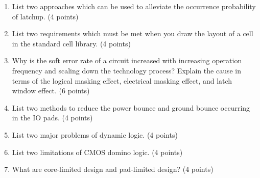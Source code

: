 \documentclass[10pt]{article}
\begin{document}
\begin{enumerate}[label=(\alph*)]
\item List two approaches which can be used to alleviate the occurrence probability of latchup. (4 points)
\item List two requirements which must be met when you draw the layout of a cell in the standard cell library. (4 points)
\item Why is the soft error rate of a circuit increased with increasing operation frequency and scaling down the technology process? Explain the cause in terms of the logical masking effect, electrical masking effect, and latch window effect. (6 points)
\item List two methods to reduce the power bounce and ground bounce occurring in the IO pads. (4 points)
\item List two major problems of dynamic logic. (4 points)
\item List two limitations of CMOS domino logic. (4 points)
\item What are core-limited design and pad-limited design? (4 points)
\end{enumerate}
\end{document}
